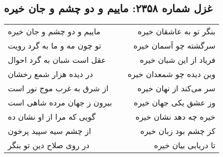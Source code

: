 \begin{center}
\section*{غزل شماره ۲۳۵۸: ماییم و دو چشم و جان خیره}
\label{sec:2358}
\begin{longtable}{l p{0.5cm} r}
ماییم و دو چشم و جان خیره
&&
بنگر تو به عاشقان خیره
\\
تو چون مه و ما به گرد رویت
&&
سرگشته چو آسمان خیره
\\
عقل است شبان به گرد احوال
&&
فریاد از این شبان خیره
\\
در دیده هزار شمع رخشان
&&
وین دیده چو شمعدان خیره
\\
از شرق به غرب موج نور است
&&
سر می‌کند از نهان خیره
\\
بیرون ز جهان مرده شاهی است
&&
وز عشق یکی جهان خیره
\\
گویی که مرا از او نشان ده
&&
خیره چه دهد نشان خیره
\\
از چشم سیه سپید پرخون
&&
کز چشم بود زبان خیره
\\
در روی صلاح دین تو بنگر
&&
تا دریابی بیان خیره
\\
\end{longtable}
\end{center}
